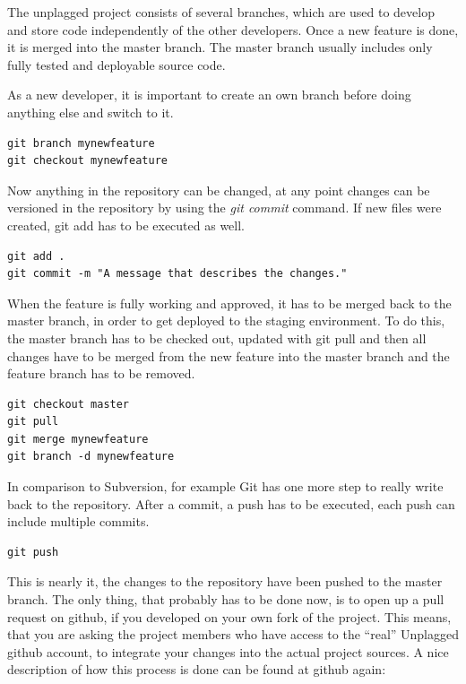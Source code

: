 The unplagged project consists of several branches, which are used to develop and store code independently of the other 
developers. Once a new feature is done, it is merged into the master branch. The master branch usually includes only 
fully tested and deployable source code. 

As a new developer, it is important to create an own branch before doing anything else and switch to it.

\begin{lstlisting}[caption=Creating branches]
git branch mynewfeature
git checkout mynewfeature
\end{lstlisting}

Now anything in the repository can be changed, at any point changes can be versioned in the repository by using the 
\textit{git commit} 
command. If new files were created, git add has to be executed as well.

\begin{lstlisting}[caption=Commiting]
git add .
git commit -m "A message that describes the changes."
\end{lstlisting}

When the feature is fully working and approved, it has to be merged back to the master branch, in order to get deployed 
to the staging environment. To do this, the master branch has to be checked out, updated with git pull and then all changes
have to be merged from the new feature into the master branch and the feature branch has to be removed.

\begin{lstlisting}[caption=Merging branches]
git checkout master
git pull
git merge mynewfeature
git branch -d mynewfeature
\end{lstlisting}

In comparison to Subversion, for example Git has one more step to really write back to the repository. After a commit, 
a push has to be executed, each push can include multiple commits.

\begin{lstlisting}[caption=Pushing to the server]
git push
\end{lstlisting}

This is nearly it, the changes to the repository have been pushed to the master branch. The only thing, that probably has to be done
now, is to open up a pull request on github, if you developed on your own fork of the project. This means, that you are
asking the project members who have access to the \enquote{real} Unplagged github account, to integrate your changes into the actual project
sources. A nice description of how this process is done can be found at github again:

